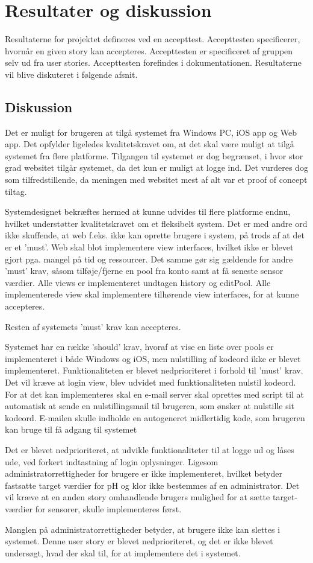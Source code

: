 \chapter{Resultater og diskussion}
Resultaterne for projektet defineres ved en accepttest. Accepttesten specificerer, hvornår en given story kan accepteres. Accepttesten er specificeret af gruppen selv ud fra user stories. Accepttesten forefindes i dokumentationen. Resultaterne vil blive diskuteret i følgende afsnit.

\section{Diskussion}
Det er muligt for brugeren at tilgå systemet fra Windows PC, iOS app og Web app. Det opfylder ligeledes kvalitetskravet om, at det skal være muligt at tilgå systemet fra flere platforme. Tilgangen til systemet er dog begrænset, i hvor stor grad websitet tilgår systemet, da det kun er muligt at logge ind. Det vurderes dog som tilfredstillende, da meningen med websitet mest af alt var et proof of concept tiltag. 

Systemdesignet bekræftes hermed at kunne udvides til flere platforme endnu, hvilket understøtter kvalitetskravet om et fleksibelt system. Det er med andre ord ikke skuffende, at web f.eks. ikke kan oprette brugere i system, på trods af at det er et 'must'. Web skal blot implementere view interfaces, hvilket ikke er blevet gjort pga. mangel på tid og ressourcer. Det samme gør sig gældende for andre 'must' krav, såsom tilføje/fjerne en pool fra konto samt at få seneste sensor værdier. Alle views er implementeret undtagen history og editPool. Alle implementerede view skal implementere tilhørende view interfaces, for at kunne accepteres. 

Resten af systemets 'must' krav kan accepteres.

Systemet har en række 'should' krav, hvoraf at vise en liste over pools er implementeret i både Windows og iOS, men nulstilling af kodeord ikke er blevet implementeret. Funktionaliteten er blevet nedprioriteret i forhold til 'must' krav. Det vil kræve at login view, blev udvidet med funktionaliteten nulstil kodeord. For at det kan implementeres skal en e-mail server skal oprettes med script til at automatisk at sende en nulstillingsmail til brugeren, som ønsker at nulstille sit kodeord. E-mailen skulle indholde en autogeneret midlertidig kode, som brugeren kan bruge til få adgang til systemet

Det er blevet nedprioriteret, at udvikle funktionaliteter til at logge ud og låses ude, ved forkert indtastning af login oplysninger. Ligesom administratorrettigheder for brugere er ikke implementeret, hvilket betyder fastsatte target værdier for pH og klor ikke bestemmes af en administrator. Det vil kræve at en anden story omhandlende brugers mulighed for at sætte target-værdier for sensorer, skulle implementeres først. 

Manglen på administratorrettigheder betyder, at brugere ikke kan slettes i systemet. Denne user story er blevet nedprioriteret, og det er ikke blevet undersøgt, hvad der skal til, for at implementere det i systemet.

